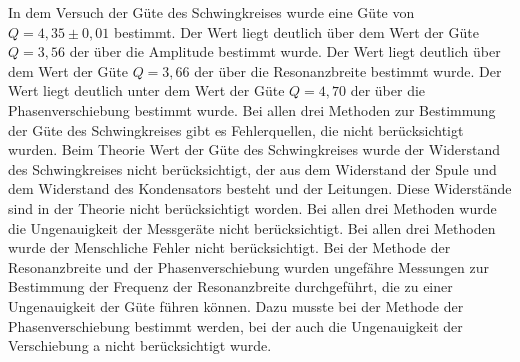 \noindent
In dem Versuch der Güte des Schwingkreises wurde eine Güte von $Q = 4,35 \pm 0,01$ bestimmt. Der Wert liegt deutlich über dem Wert 
der Güte $Q = 3,56$ der über die Amplitude bestimmt wurde.
Der Wert liegt deutlich über dem Wert der Güte $Q = 3,66$ der über die Resonanzbreite bestimmt wurde.
Der Wert liegt deutlich unter dem Wert der Güte $Q = 4,70$ der über die Phasenverschiebung bestimmt wurde.
Bei allen drei Methoden zur Bestimmung der Güte des Schwingkreises gibt es Fehlerquellen, die nicht berücksichtigt wurden.
Beim Theorie Wert der Güte des Schwingkreises wurde der Widerstand des Schwingkreises nicht berücksichtigt, der aus dem Widerstand der Spule und dem Widerstand des Kondensators besteht und der Leitungen. Diese Widerstände sind in der Theorie nicht berücksichtigt worden.
Bei allen drei Methoden wurde die Ungenauigkeit der Messgeräte nicht berücksichtigt.
Bei allen drei Methoden wurde der Menschliche Fehler nicht berücksichtigt.
Bei der Methode der Resonanzbreite und der Phasenverschiebung wurden ungefähre Messungen zur Bestimmung der Frequenz der Resonanzbreite durchgeführt, die zu einer Ungenauigkeit der Güte führen können.
Dazu musste bei der Methode der Phasenverschiebung bestimmt werden, bei der auch die Ungenauigkeit der Verschiebung a nicht berücksichtigt wurde.
